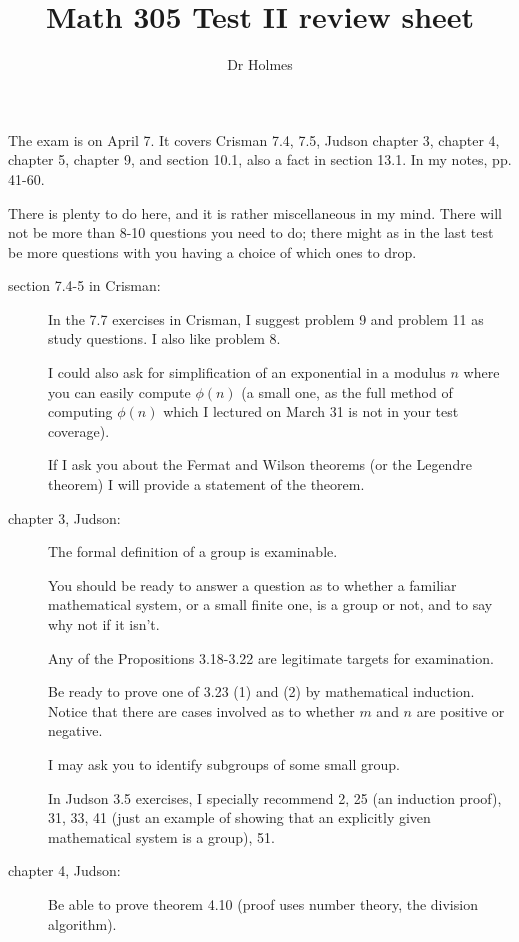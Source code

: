 \documentclass[12pt]{article}
\title{Math 305 Test II review sheet}
\author{Dr Holmes}
\begin{document}
\maketitle

The exam is on April 7.  It covers  Crisman 7.4, 7.5, Judson chapter 3, chapter 4, chapter 5, chapter 9, and section 10.1, also a fact in section 13.1.
In my notes, pp. 41-60.

There is plenty to do here, and it is rather miscellaneous in my mind.  There will not be more than 8-10 questions you need to do;  there might as in the last test be more questions with you having a choice of which ones to drop.

\begin{description}

\item[section 7.4-5 in Crisman:]  In the 7.7 exercises in Crisman, I suggest problem 9 and problem 11 as study questions.  I also like problem 8.

I could also ask for simplification of an exponential in a modulus $n$ where you can easily compute $\phi(n)$ (a small one, as the full method of computing $\phi(n)$ which I lectured on March 31 is not in your test coverage).

If I ask you about the Fermat and Wilson theorems (or the Legendre theorem) I will provide a statement of the theorem.

\item[chapter 3, Judson:]  

The formal definition of a group is examinable.

You should be ready to answer a question as to whether a familiar mathematical system, or a small finite one, is a group or not, and to say why not if it isn't.

Any of the Propositions 3.18-3.22 are legitimate targets for examination.

Be ready to prove one of 3.23 (1) and (2) by mathematical induction.  Notice that there are cases involved
as to whether $m$ and $n$ are positive or negative.  

I may ask you to identify subgroups of some small group.

In Judson 3.5 exercises, I specially recommend 2, 25 (an induction proof), 31, 33, 41 (just an example of showing that an explicitly given mathematical system is a group), 51.

\item[chapter 4, Judson:]

Be able to prove theorem 4.10 (proof uses number theory, the division algorithm).


\end{description}
\end{document}
